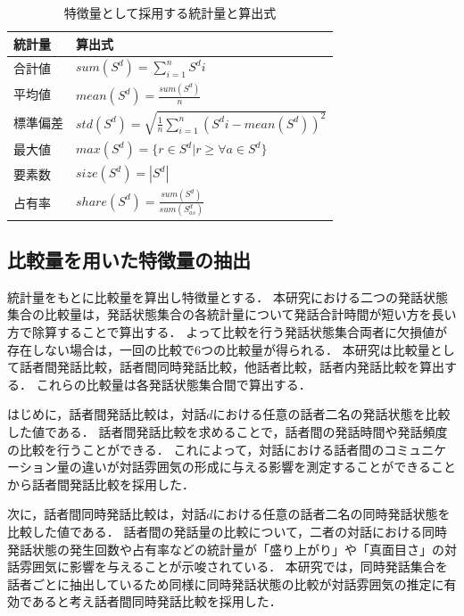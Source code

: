 \begingroup
\renewcommand{\arraystretch}{1.5}
\begin{table}[t]
    \caption{特徴量として採用する統計量と算出式}
    \centering
    \begin{tabular}{ll}
        \hline
        統計量 & 算出式 \\
        \hline\hline
        合計値 & $sum(S^d) = \sum_{i=1}^n S^di$ \\
        \hline
        平均値 & $mean(S^d) = \frac{sum(S^d)}{n}$ \\
        \hline
        標準偏差 & $std(S^d) = \sqrt{\frac{1}{n}\sum_{i=1}^n (S^di - mean(S^d))^2}$ \\
        \hline
        最大値 & $max(S^d) = \{r\in{S^d} | r \geq \forall{a}\in{S^d} \}$ \\
        \hline
        要素数  & $size(S^d) = |S^d|$ \\
        \hline
        占有率  & $share(S^d) = \frac{sum(S^d)}{sum(S^d_{as})}$ \\
        \hline
    \end{tabular}
    \label{tab:statistics_and_formulas}
\end{table}
\endgroup

\subsection{比較量を用いた特徴量の抽出}

統計量をもとに比較量を算出し特徴量とする．
本研究における二つの発話状態集合の比較量は，発話状態集合の各統計量について発話合計時間が短い方を長い方で除算することで算出する．
よって比較を行う発話状態集合両者に欠損値が存在しない場合は，一回の比較で6つの比較量が得られる．
本研究は比較量として話者間発話比較，話者間同時発話比較，他話者比較，話者内発話比較を算出する．
これらの比較量は各発話状態集合間で算出する．

はじめに，話者間発話比較は，対話$d$における任意の話者二名の発話状態を比較した値である．
話者間発話比較を求めることで，話者間の発話時間や発話頻度の比較を行うことができる．
これによって，対話における話者間のコミュニケーション量の違いが対話雰囲気の形成に与える影響を測定することができることから話者間発話比較を採用した．

次に，話者間同時発話比較は，対話$d$における任意の話者二名の同時発話状態を比較した値である．
話者間の発話量の比較について，二者の対話における同時発話状態の発生回数や占有率などの統計量が「盛り上がり」や「真面目さ」の対話雰囲気に影響を与えることが示唆されている\cite{Ito}\cite{Toyota}．
本研究では，同時発話集合を話者ごとに抽出しているため同様に同時発話状態の比較が対話雰囲気の推定に有効であると考え話者間同時発話比較を採用した．

